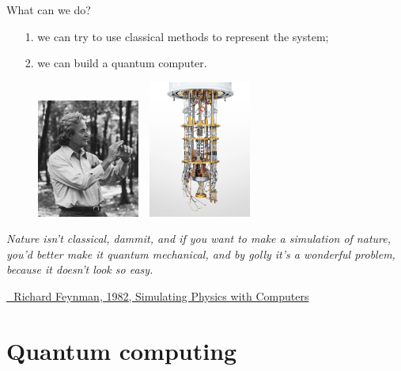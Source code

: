 \documentclass[aspectratio=169, 8pt, xcolor={svgnames}, hyperref={linkcolor=black}]{beamer}
\begin{document}
\begin{frame}{What can we do?}
\pause
\begin{itemize}[noitemsep]
\item[1.] we can try to use classical methods to represent the system;
\pause
\item[2.] we can build a quantum computer.
\end{itemize}
\pause
\begin{figure}
   \includegraphics[width=0.3\textwidth, height=0.55\textheight]{figures/feynmann.jpg}%
   $\,\,$ \pause
   \includegraphics[width=0.3\textwidth, height=0.55\textheight]{figures/qcomp.png}
\end{figure}

\small{ \textit{Nature isn't classical, dammit, and if you want to make a simulation of nature,
you'd better make it quantum mechanical, and by golly it's a wonderful problem,
because it doesn't look so easy.} }

\href{https://link.springer.com/article/10.1007/BF02650179}{\faBook\,\, Richard Feynman, 1982, Simulating Physics with Computers}
\end{frame}


\section{Quantum computing}
\end{document}
